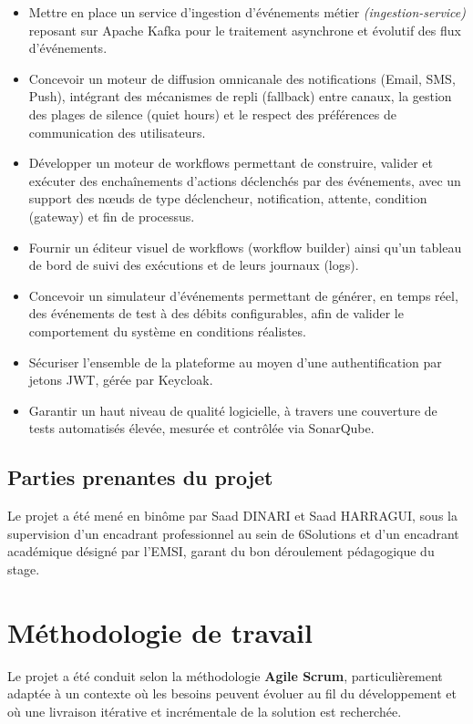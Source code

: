 \documentclass[12pt,a4paper]{report}
\begin{document}
\begin{itemize}
  \item Mettre en place un service d'ingestion d'événements métier \textit{(ingestion-service)} reposant sur Apache Kafka pour le traitement asynchrone et évolutif des flux d'événements.
  \item Concevoir un moteur de diffusion omnicanale des notifications (Email, SMS, Push), intégrant des mécanismes de repli (fallback) entre canaux, la gestion des plages de silence (quiet hours) et le respect des préférences de communication des utilisateurs.
  \item Développer un moteur de workflows permettant de construire, valider et exécuter des enchaînements d'actions déclenchés par des événements, avec un support des n\oe uds de type déclencheur, notification, attente, condition (gateway) et fin de processus.
  \item Fournir un éditeur visuel de workflows (workflow builder) ainsi qu'un tableau de bord de suivi des exécutions et de leurs journaux (logs).
  \item Concevoir un simulateur d'événements permettant de générer, en temps réel, des événements de test à des débits configurables, afin de valider le comportement du système en conditions réalistes.
  \item Sécuriser l'ensemble de la plateforme au moyen d'une authentification par jetons JWT, gérée par Keycloak.
  \item Garantir un haut niveau de qualité logicielle, à travers une couverture de tests automatisés élevée, mesurée et contrôlée via SonarQube.
\end{itemize}

\subsection{Parties prenantes du projet}

Le projet a été mené en binôme par Saad DINARI et Saad HARRAGUI, sous la supervision d'un encadrant professionnel au sein de 6Solutions et d'un encadrant académique désigné par l'EMSI, garant du bon déroulement pédagogique du stage.

\section{Méthodologie de travail}

Le projet a été conduit selon la méthodologie \textbf{Agile Scrum}, particulièrement adaptée à un contexte où les besoins peuvent évoluer au fil du développement et où une livraison itérative et incrémentale de la solution est recherchée.
\end{document}
